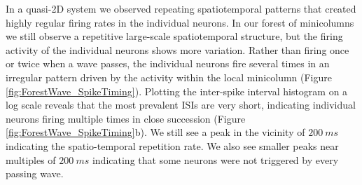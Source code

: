 In a quasi-2D system we observed repeating spatiotemporal patterns that created highly regular firing rates in the individual neurons.
In our forest of minicolumns we still observe a repetitive large-scale spatiotemporal structure, but the firing activity of the individual neurons shows more variation.
Rather than firing once or twice when a wave passes, the individual neurons fire several times in an irregular pattern 
driven by the activity within the local minicolumn (Figure \ref{fig:ForestWave_SpikeTiming}).
Plotting the inter-spike interval histogram on a log scale reveals that the most prevalent ISIs are very short, 
indicating individual neurons firing multiple times in close succession (Figure \ref{fig:ForestWave_SpikeTiming}b).
We still see a peak in the vicinity of $200~ms$ indicating the spatio-temporal repetition rate.
We also see smaller peaks near multiples of $200~ms$ indicating that some neurons were not triggered by every passing wave.
